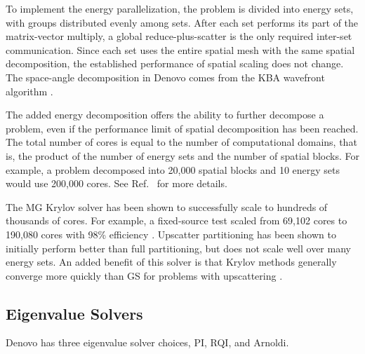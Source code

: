 \documentclass{article}                                                                           %
\begin{document}
To implement the energy parallelization, the problem is divided into energy sets, with groups distributed evenly among sets. After each set performs its part of the matrix-vector multiply, a global reduce-plus-scatter is the only required inter-set communication. Since each set uses the entire spatial mesh with the same spatial decomposition, the established performance of spatial scaling does not change. The space-angle decomposition in Denovo comes from the KBA wavefront algorithm \cite{Baker1998}. %

The added energy decomposition offers the ability to further decompose a problem, even if the performance limit of spatial decomposition has been reached. The total number of cores is equal to the number of computational domains, that is, the product of the number of energy sets and the number of spatial blocks. For example, a problem decomposed into 20,000 spatial blocks and 10 energy sets would use 200,000 cores. See Ref.\ \cite{Evans2011} for more details.

The MG Krylov solver has been shown to successfully scale to hundreds of thousands of cores. For example, a fixed-source test scaled from 69,102 cores to 190,080 cores with 98\% efficiency \cite{Slaybaugh2011}. Upscatter partitioning has been shown to initially perform better than full partitioning, but does not scale well over many energy sets.  An added benefit of this solver is that Krylov methods generally converge more quickly than GS for problems with upscattering \cite{Davidson2013}.

\subsection{Eigenvalue Solvers}
\label{sec:eigenvalue}
Denovo has three eigenvalue solver choices, PI, RQI, and Arnoldi. 
\end{document}
